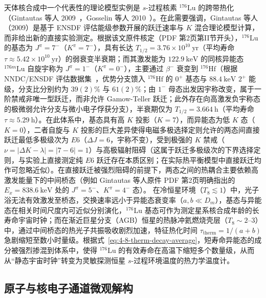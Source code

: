 天体核合成中一个代表性的理论模型实例是 $s$-过程核素 $^{176}\mathrm{Lu}$ 的跨带热化（Gintautas 等人 2009~\cite{gintautas-2009-176lu-thermal-equilibration}，Gosselin 等人 2010~\cite{gosselin-2010-plasma-isomers-176lu-180ta}）。在此需要强调，Gintautas 等人（2009）是基于 ENSDF 评估能级参数开展的跃迁速率与 $K$ 混合理论模型计算，而非给出新的直接实验测定。根据该文原件核定（PDF 第2页第II节开头），$^{176}\mathrm{Lu}$ 的基态为 $J^\pi = 7^-$（$K^\pi = 7^-$），具有长达 $T_{1/2} = 3.76 \times 10^{10}\ \mathrm{yr}$（平均寿命 $\tau \approx 5.42 \times 10^{10}\ \mathrm{yr}$）的弱衰变半衰期；而其激发能为 $122.9\ \mathrm{keV}$ 的同核异能态 $^{176m}\mathrm{Lu}$ 自旋宇称为 $J^\pi = 1^-$（$K^\pi = 0^-$），主要通过 $\beta^-$ 衰变到 $^{176}\mathrm{Hf}$（根据 NNDC/ENSDF 评估数据集~\cite{nndc-176lu-beta-2006-snapshot}，优势分支馈入 $^{176}\mathrm{Hf}$ 的 $0^+$ 基态与 $88.4\ \mathrm{keV}$ $2^+$ 能级，分支比分别约为 $39(2)\%$ 与 $61(2)\%$；由 $1^-$ 母态出发因宇称改变，属于一阶禁戒非唯一型跃迁，而非允许 Gamow-Teller 跃迁；此外存在向高激发负宇称态的极微弱允许分支与微小电子俘获分支），半衰期仅为 $T_{1/2} = 3.664\ \mathrm{h}$（平均寿命 $\tau \approx 5.29\ \mathrm{h}$）。在此体系中，基态具有高 $K$ 投影（$K=7$），而异能态为低 $K$ 态（$K=0$），二者自旋与 $K$ 投影的巨大差异使得电磁多极选择定则允许的两态间直接跃迁最低多极级次为 $E6$（$\Delta J = 6$，宇称不变），受到极强的 $K$ 禁戒（$\nu = |\Delta K - \lambda| = |7 - 6| = 1$）与高极辐射阻碍（这属于跃迁多极级次的下界选择定则，与实验上直接测定纯 $E6$ 跃迁存在本质区别；在实际热平衡模型中直接跃迁均作可忽略近似）。在直接跃迁被强烈阻碍的前提下，两态之间的热耦合主要依赖高激发能量下的中间桥态（例如 Gintautas 等人原件 PDF 第2页明确指出的 $E_x = 838.6\ \mathrm{keV}$ 处的 $J^\pi = 5^-$、$K^\pi = 4^-$ 态）。
在冷恒星环境（$T_8 \lesssim 1$）中，光子浴无法有效激发至桥态，交换速率远小于异能态衰变率（$a, b \ll D_m$），基态与异能态在相关时间尺度内可近似分别演化，$^{176}\mathrm{Lu}$ 基态可作为测定星系核合成年龄的长寿命宇宙时钟；而在渐近巨星分支（AGB）恒星的热脉冲氦燃烧壳层（$T_8 \sim 2$--$3$）中，通过中间桥态的热光子共振吸收剧烈加速，特征热化时间 $\tau_{\mathrm{therm}} = 1/(a+b)$ 急剧缩短至数小时量级。根据式~\eqref{eq:4-8-therm-decay-average}，短寿命异能态的成分被强烈掺混到体系中，使得 $^{176}\mathrm{Lu}$ 的有效寿命在高温下缩短多个数量级，从而从“静态宇宙时钟”转变为灵敏探测恒星 $s$-过程环境温度的热力学温度计。

\subsection{原子与核电子通道微观解构}\label{sec:4-8-2}

